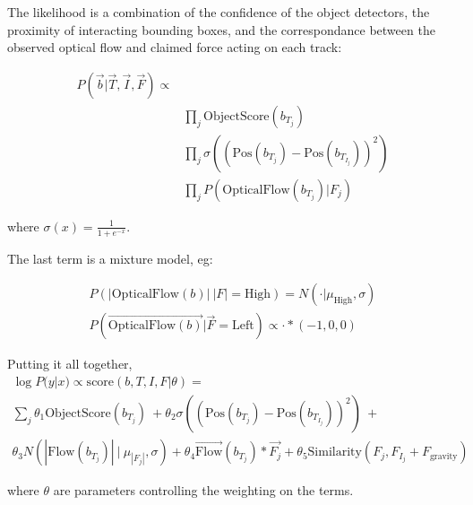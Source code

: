 \documentclass{article}
\begin{document}
The likelihood is a combination of the confidence of the object detectors, the proximity of interacting bounding boxes, and the correspondance between the observed optical flow and claimed force acting on each track:

\begin{equation}
  \begin{split}
  P(\vec{b}|\vec{T},\vec{I},\vec{F})\propto\\
  &\prod_j {\text{ObjectScore}(b_{T_j})}\\
  &\prod_j {\sigma((\text{Pos}(b_{T_j})-\text{Pos}(b_{T_{I_j}}))^2)}\\
  &\prod_j P(\text{OpticalFlow}(b_{T_j})|F_j)
\end{split}
\end{equation}

where $\sigma(x)=\frac{1}{1+e^{-x}}$.

The last term is a mixture model, eg:

\begin{gather}
  P(|\text{OpticalFlow}(b)|\ |F|=\text{High}) = N(\cdot|\mu_{\text{High}}, \sigma)\\
  P(\vec{\text{OpticalFlow}(b)}| \vec{F}=\text{Left}) \propto \cdot * (-1, 0, 0)
\end{gather}

Putting it all together,
\begin{equation}
  \begin{split}
    \log{P(y|x})\propto \text{score}(b,T,I,F|\theta)=\\
    \sum_j \theta_1\text{ObjectScore}(b_{T_j})\ +  \theta_2\sigma((\text{Pos}(b_{T_j})-\text{Pos}(b_{T_{I_j}}))^2)\ +\\
    \theta_3 N(|\text{Flow}(b_{T_j})|\ |\ \mu_{|F_j|}, \sigma) + \theta_4 \vec{\text{Flow}}(b_{T_j})*\vec{F_j} + \theta_5 \text{Similarity}(F_j, F_{I_j}+F_\text{gravity})
  \end{split}
\end{equation}

where $\theta$ are parameters controlling the weighting on the terms.
\end{document}
